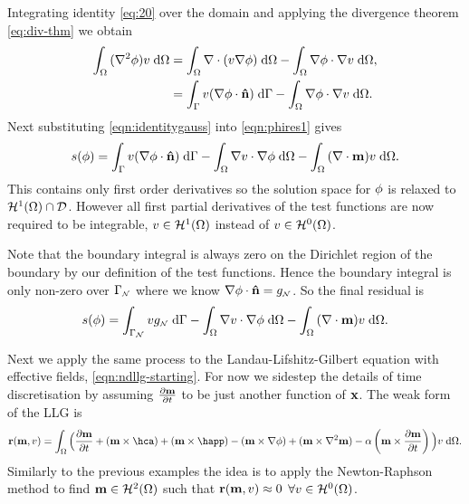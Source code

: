 Integrating identity \cref{eq:20} over the domain and applying the divergence theorem \cref{eq:div-thm} we obtain
\begin{equation}
  \begin{aligned}
    {\int_{\Omega} { (\nabla^2\phi) v} {\; \mathrm{{d}}}{\Omega}} &=  {\int_{\Omega} {\nabla \cdot (v \nabla \phi)} {\; \mathrm{{d}}} {\Omega}}
           - {\int_{\Omega} {\nabla \phi \cdot \nabla v} {\; \mathrm{{d}}} {\Omega}},\\
    &= {\int_{{\Gamma}} {v (\nabla \phi \cdot \mathbf{\hat{n}})} {\; \mathrm{{d}}} {{\Gamma}}} 
    - {\int_{\Omega} { \nabla \phi \cdot \nabla v} {\; \mathrm{{d}}} {\Omega}}.
    \label{eqn:identitygauss}
  \end{aligned} 
\end{equation}
Next substituting \cref{eqn:identitygauss} into \cref{eqn:phires1} gives
\begin{equation}
  s(\phi) = {\int_{{\Gamma}} { v (\nabla \phi \cdot \mathbf{\hat{n}}) } {\; \mathrm{{d}}} {{\Gamma}}}
  - {\int_{\Omega} { \nabla v \cdot \nabla \phi } {\; \mathrm{{d}}} {\Omega}}
  - {\int_{\Omega} { (\nabla \cdot \mathbf{m}) v } {\; \mathrm{{d}}} {\Omega}}.
\end{equation}
This contains only first order derivatives so the solution space for $\phi$ is relaxed to $\mathcal{H}^1(\Omega) \cap \mathcal{D}$. 
However all first partial derivatives of the test functions are now required to be integrable, \ie $v \in \mathcal{H}^1(\Omega)$ instead of $v \in \mathcal{H}^0(\Omega)$.

Note that the boundary integral is always zero on the Dirichlet region of the boundary by our definition of the test functions. 
Hence the boundary integral is only non-zero over ${\Gamma}_{{\scriptscriptstyle{\mathcal{N}}}}$ where we know $\nabla \phi \cdot \mathbf{\hat{n}} = g_{{\scriptscriptstyle{\mathcal{N}}}}$.
So the final residual is
\begin{equation}
  s(\phi) = \int_{{\Gamma}_{\scriptscriptstyle{\mathcal{N}}}} v g_{\scriptscriptstyle{\mathcal{N}}} {\; \mathrm{{d}}} {\Gamma}
  - {\int_{\Omega} { \nabla v \cdot \nabla \phi} {\; \mathrm{{d}}} {\Omega}}
  - {\int_{\Omega} { (\nabla \cdot \mathbf{m}) v} {\; \mathrm{{d}}} {\Omega}}.
  \label{res:contphi}
\end{equation}


Next we apply the same process to the Landau-Lifshitz-Gilbert equation with effective fields, \cref{eqn:ndllg-starting}.
For now we sidestep the details of time discretisation by assuming $\frac{\partial \mathbf{m}}{\partial t}$ to be just another function of $\mathbf{x}$.
The weak form of the LLG is
\begin{equation}
  \rllgv(\mv, \test) = \int_\magd \Big( \dmdt
  + (\mv \times \hca) + (\mv \times \happ) \\
  - (\mv \times \nabla \phi) + (\mv \times \lap \mv)
  - \dampc \left( \mv \times \dmdt \right)
  \Big) \test \d\magd
  . \label{res:contllg}
\end{equation}
Similarly to the previous examples the idea is to apply the Newton-Raphson method to find $\mathbf{m} \in \mathcal{H}^2(\Omega)$ such that $\mathbf{r}(\mathbf{m}, v) \approx 0$ $\forall v \in \mathcal{H}^0(\Omega)$.

